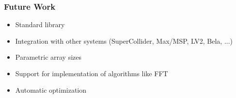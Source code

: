 \documentclass{beamer}
\begin{document}
\begin{frame}[fragile]
\frametitle{Future Work}

\begin{itemize}
\item Standard library
\item Integration with other systems (SuperCollider, Max/MSP, LV2, Bela, ...)
\item Parametric array sizes
\item Support for implementation of algorithms like FFT
\item Automatic optimization
\end{itemize}

\end{frame}
\end{document}
